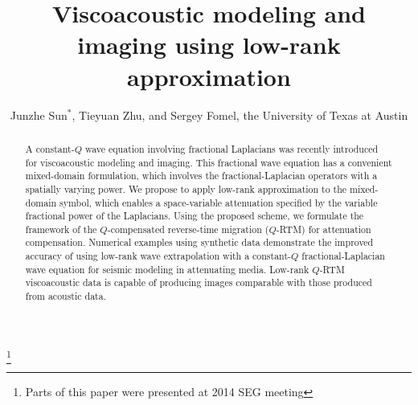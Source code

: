 \title{Viscoacoustic modeling and imaging using low-rank approximation}
\author{Junzhe Sun$^{*}$, Tieyuan Zhu, and Sergey Fomel, the University of Texas at Austin}
\maketitle

\address{
\footnotemark[1]Bureau of Economic Geology \\
John A. and Katherine G. Jackson School of Geosciences \\
The University of Texas at Austin \\
University Station, Box X \\
Austin, TX 78713-8924 \\
}

\footnote{Parts of this paper were presented at 2014 SEG meeting}


\begin{abstract}
A constant-$Q$ wave equation involving fractional Laplacians was recently introduced for viscoacoustic modeling and imaging. This fractional wave equation has a convenient mixed-domain formulation, which involves the fractional-Laplacian operators with a spatially varying power. We propose to apply low-rank approximation to the mixed-domain symbol, which enables a space-variable attenuation specified by the variable fractional power of the Laplacians. Using the proposed scheme, we formulate the framework of the $Q$-compensated reverse-time migration ($Q$-RTM) for attenuation compensation. Numerical examples using synthetic data demonstrate the improved accuracy of using low-rank wave extrapolation with a constant-$Q$ fractional-Laplacian wave equation for seismic modeling in attenuating media. Low-rank $Q$-RTM  viscoacoustic data is capable of producing images comparable  with those produced from acoustic data.
\end{abstract}

